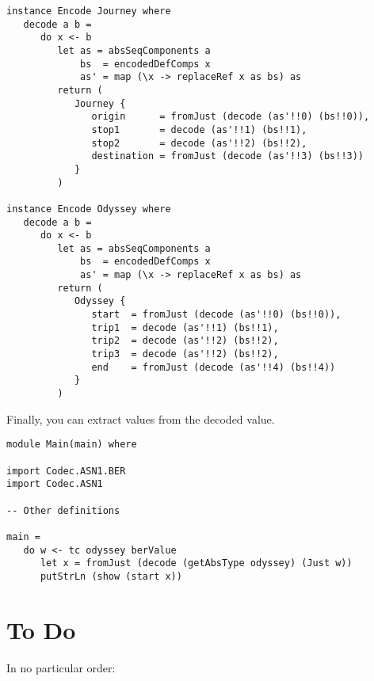 \documentclass{article}
\begin{document}
\begin{lstlisting}[frame=single]
instance Encode Journey where
   decode a b =
      do x <- b
         let as = absSeqComponents a
             bs  = encodedDefComps x
             as' = map (\x -> replaceRef x as bs) as
         return (
            Journey {
               origin      = fromJust (decode (as'!!0) (bs!!0)),
               stop1       = decode (as'!!1) (bs!!1),
               stop2       = decode (as'!!2) (bs!!2),
               destination = fromJust (decode (as'!!3) (bs!!3))            
            }
         )

instance Encode Odyssey where
   decode a b =
      do x <- b
         let as = absSeqComponents a
             bs  = encodedDefComps x
             as' = map (\x -> replaceRef x as bs) as
         return (
            Odyssey {
               start  = fromJust (decode (as'!!0) (bs!!0)),
               trip1  = decode (as'!!1) (bs!!1),
               trip2  = decode (as'!!2) (bs!!2),
               trip3  = decode (as'!!2) (bs!!2),
               end    = fromJust (decode (as'!!4) (bs!!4))
            }
         )
\end{lstlisting}

Finally, you can extract values from the decoded value.

\begin{lstlisting}[frame=single]
module Main(main) where

import Codec.ASN1.BER
import Codec.ASN1

-- Other definitions

main = 
   do w <- tc odyssey berValue
      let x = fromJust (decode (getAbsType odyssey) (Just w))
      putStrLn (show (start x))
\end{lstlisting}

\section{To Do}

In no particular order:
\end{document}
